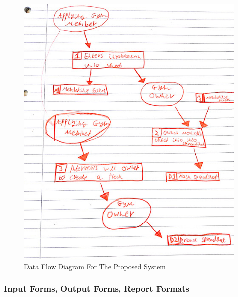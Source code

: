 \begin{figure}[H]
    \includegraphics[width=\textwidth]{ProposedDFD.jpg}
    \caption{Data Flow Diagram For The Proposed System} \label{fig:Data Flow Diagram For The Current System}
\end{figure}


\subsubsection{Input Forms, Output Forms, Report Formats}

